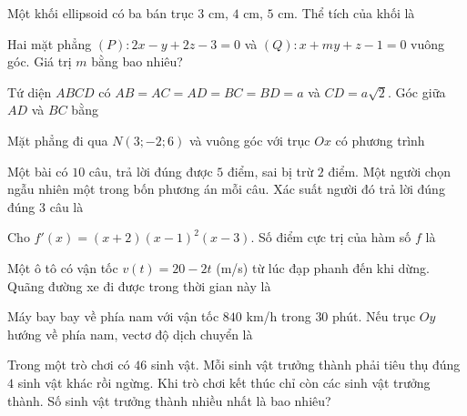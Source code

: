 \begin{ex}
Một khối ellipsoid có ba bán trục $3$ cm, $4$ cm, $5$ cm. Thể tích của khối là
\end{ex}

\begin{ex}
Hai mặt phẳng $(P):2x-y+2z-3=0$ và $(Q):x+my+z-1=0$ vuông góc. Giá trị $m$ bằng bao nhiêu?
\end{ex}

\begin{ex}
Tứ diện $ABCD$ có $AB=AC=AD=BC=BD=a$ và $CD=a\sqrt2$. Góc giữa $AD$ và $BC$ bằng
\end{ex}

\begin{ex}
Mặt phẳng đi qua $N(3;-2;6)$ và vuông góc với trục $Ox$ có phương trình
\end{ex}

\begin{ex}
Một bài có $10$ câu, trả lời đúng được $5$ điểm, sai bị trừ $2$ điểm. Một người chọn ngẫu nhiên một trong bốn phương án mỗi câu. Xác suất người đó trả lời đúng đúng $3$ câu là
\end{ex}

\begin{ex}
Cho $f'(x)=(x+2)(x-1)^2(x-3)$. Số điểm cực trị của hàm số $f$ là
\end{ex}

\begin{ex}
Một ô tô có vận tốc $v(t)=20-2t$ (m/s) từ lúc đạp phanh đến khi dừng. Quãng đường xe đi được trong thời gian này là
\end{ex}

\begin{ex}
Máy bay bay về phía nam với vận tốc $840$ km/h trong $30$ phút. Nếu trục $Oy$ hướng về phía nam, vectơ độ dịch chuyển là
\end{ex}

\begin{ex}
Trong một trò chơi có $46$ sinh vật. Mỗi sinh vật trưởng thành phải tiêu thụ đúng $4$ sinh vật khác rồi ngừng. Khi trò chơi kết thúc chỉ còn các sinh vật trưởng thành. Số sinh vật trưởng thành nhiều nhất là bao nhiêu?
\end{ex}

